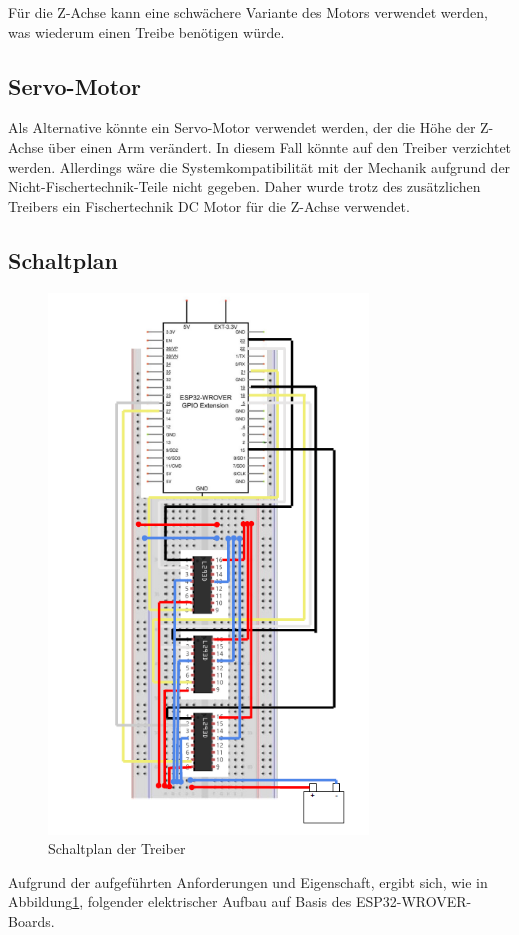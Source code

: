 \documentclass[conference,compsoc,final,a4paper]{IEEEtran}
\begin{document}
\noindent Für die Z-Achse kann eine schwächere Variante des Motors verwendet werden, was wiederum einen Treibe benötigen würde.

\subsection{Servo-Motor}

Als Alternative könnte ein Servo-Motor verwendet werden, der die Höhe der Z-Achse über einen Arm verändert. 
In diesem Fall könnte auf den Treiber verzichtet werden. Allerdings wäre die Systemkompatibilität mit der Mechanik aufgrund der Nicht-Fischertechnik-Teile nicht gegeben. 
Daher wurde trotz des zusätzlichen Treibers ein Fischertechnik DC Motor für die Z-Achse verwendet.

\subsection{Schaltplan}
\begin{figure}[h]
\includegraphics[width=8.5cm]{../images/schaltplan.png}
\caption{Schaltplan der Treiber}\label{Elektrik:Schaltplan}
\end{figure}

Aufgrund der aufgeführten Anforderungen und Eigenschaft, ergibt sich, wie in Abbildung\ref{Elektrik:Schaltplan}, folgender elektrischer Aufbau auf Basis des ESP32-WROVER-Boards.
\end{document}
